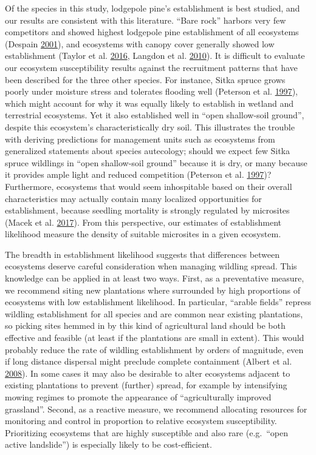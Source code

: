 \documentclass[
]{article}
\begin{document}
Of the species in this study, lodgepole pine's establishment is best studied, and our results are consistent with this literature.
``Bare rock'' harbors very few competitors and showed highest lodgepole pine establishment of all ecosystems (Despain \protect\hyperlink{ref-despainDispersalEcologyLodgepole2001}{2001}), and ecosystems with canopy cover generally showed low establishment (Taylor et al. \protect\hyperlink{ref-taylorDriversPlantInvasion2016}{2016}, Langdon et al. \protect\hyperlink{ref-langdonPinusContortaInvasion2010}{2010}).
It is difficult to evaluate our ecosystem susceptibility results against the recruitment patterns that have been described for the three other species.
For instance, Sitka spruce grows poorly under moisture stress and tolerates flooding well (Peterson et al. \protect\hyperlink{ref-petersonEcologyManagementSitka1997}{1997}), which might account for why it was equally likely to establish in wetland and terrestrial ecosystems.
Yet it also established well in ``open shallow-soil ground'', despite this ecosystem's characteristically dry soil.
This illustrates the trouble with deriving predictions for management units such as ecosystems from generalized statements about species autecology; should we expect few Sitka spruce wildlings in ``open shallow-soil ground'' because it is dry, or many because it provides ample light and reduced competition (Peterson et al. \protect\hyperlink{ref-petersonEcologyManagementSitka1997}{1997})?
Furthermore, ecosystems that would seem inhospitable based on their overall characteristics may actually contain many localized opportunities for establishment, because seedling mortality is strongly regulated by microsites (Macek et al. \protect\hyperlink{ref-macekLifeDeathPicea2017}{2017}).
From this perspective, our estimates of establishment likelihood measure the density of suitable microsites in a given ecosystem.

The breadth in establishment likelihood suggests that differences between ecosystems deserve careful consideration when managing wildling spread.
This knowledge can be applied in at least two ways.
First, as a preventative measure, we recommend siting new plantations where surrounded by high proportions of ecosystems with low establishment likelihood.
In particular, ``arable fields'' repress wildling establishment for all species and are common near existing plantations, so picking sites hemmed in by this kind of agricultural land should be both effective and feasible (at least if the plantations are small in extent).
This would probably reduce the rate of wildling establishment by orders of magnitude, even if long distance dispersal might preclude complete containment (Albert et al. \protect\hyperlink{ref-albertLanduseChangeSubalpine2008}{2008}).
In some cases it may also be desirable to alter ecosystems adjacent to existing plantations to prevent (further) spread, for example by intensifying mowing regimes to promote the appearance of ``agriculturally improved grassland''.
Second, as a reactive measure, we recommend allocating resources for monitoring and control in proportion to relative ecosystem susceptibility.
Prioritizing ecosystems that are highly susceptible and also rare (e.g.~``open active landslide'') is especially likely to be cost-efficient.
\end{document}
